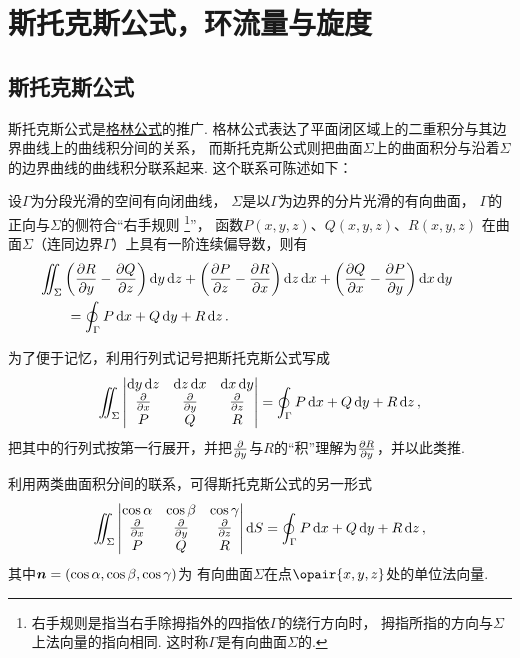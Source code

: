 \section{斯托克斯公式，环流量与旋度}
\subsection{斯托克斯公式}
斯托克斯公式是\hyperref[equation:线积分与面积分.格林公式]{格林公式}的推广.
格林公式表达了平面闭区域上的二重积分与其边界曲线上的曲线积分间的关系，
而斯托克斯公式则把曲面\(\Sigma\)上的曲面积分与沿着\(\Sigma\)的边界曲线的曲线积分联系起来.
这个联系可陈述如下：

\begin{theorem}[斯托克斯公式]
设\(\Gamma\)为分段光滑的空间有向闭曲线，
\(\Sigma\)是以\(\Gamma\)为边界的分片光滑的有向曲面，
\(\Gamma\)的正向与\(\Sigma\)的侧符合“右手规则%
\footnote{右手规则是指当右手除拇指外的四指依\(\Gamma\)的绕行方向时，
拇指所指的方向与\(\Sigma\)上法向量的指向相同.
这时称\(\Gamma\)是有向曲面\(\Sigma\)的.}”，
函数\(P(x,y,z)\)、\(Q(x,y,z)\)、\(R(x,y,z)\)
在曲面\(\Sigma\)（连同边界\(\Gamma\)）上具有一阶连续偏导数，则有
\begin{equation}\label{equation:线积分与面积分.斯托克斯公式}
	\begin{split}
		&\hspace{-20pt}\iint_\Sigma
			\left( \pdv{R}{y} - \pdv{Q}{z} \right)\dd{y}\dd{z}
			+\left( \pdv{P}{z} - \pdv{R}{x} \right)\dd{z}\dd{x}
			+\left( \pdv{Q}{x} - \pdv{P}{y} \right)\dd{x}\dd{y} \\
		&= \oint_\Gamma P\dd{x}+Q\dd{y}+R\dd{z}.
	\end{split}
\end{equation}
\end{theorem}

为了便于记忆，利用行列式记号把斯托克斯公式写成\[
	\iint_\Sigma \begin{vmatrix}
		\dd{y}\dd{z} & \dd{z}\dd{x} & \dd{x}\dd{y} \\
		\pdv{x} & \pdv{y} & \pdv{z} \\
		P & Q & R \\
	\end{vmatrix}
	= \oint_\Gamma P\dd{x}+Q\dd{y}+R\dd{z},
\]把其中的行列式按第一行展开，并把\(\pdv{y}\)与\(R\)的“积”理解为\(\pdv{R}{y}\)，并以此类推.

利用两类曲面积分间的联系，可得斯托克斯公式的另一形式\[
	\iint_\Sigma \begin{vmatrix}
		\cos\alpha & \cos\beta & \cos\gamma \\
		\pdv{x} & \pdv{y} & \pdv{z} \\
		P & Q & R \\
	\end{vmatrix} \dd{S}
	= \oint_\Gamma P\dd{x}+Q\dd{y}+R\dd{z},
\]
其中\(\boldsymbol{n}=(\cos\alpha,\cos\beta,\cos\gamma)\)为
有向曲面\(\Sigma\)在点\(\opair{x,y,z}\)处的单位法向量.

